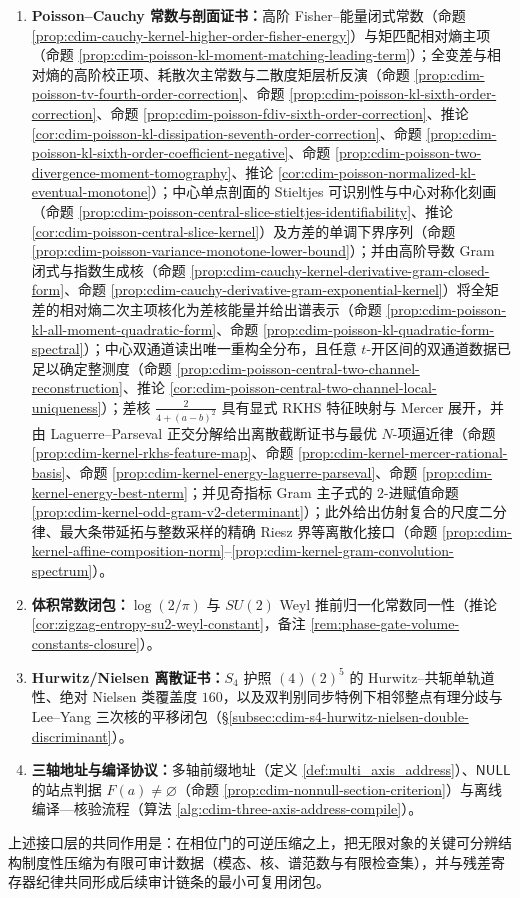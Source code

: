 \begin{enumerate}
  \item \textbf{Poisson--Cauchy 常数与剖面证书：}高阶 Fisher--能量闭式常数（命题 \ref{prop:cdim-cauchy-kernel-higher-order-fisher-energy}）与矩匹配相对熵主项（命题 \ref{prop:cdim-poisson-kl-moment-matching-leading-term}）；全变差与相对熵的高阶校正项、耗散次主常数与二散度矩层析反演（命题 \ref{prop:cdim-poisson-tv-fourth-order-correction}、命题 \ref{prop:cdim-poisson-kl-sixth-order-correction}、命题 \ref{prop:cdim-poisson-fdiv-sixth-order-correction}、推论 \ref{cor:cdim-poisson-kl-dissipation-seventh-order-correction}、命题 \ref{prop:cdim-poisson-kl-sixth-order-coefficient-negative}、命题 \ref{prop:cdim-poisson-two-divergence-moment-tomography}、推论 \ref{cor:cdim-poisson-normalized-kl-eventual-monotone}）；中心单点剖面的 Stieltjes 可识别性与中心对称化刻画（命题 \ref{prop:cdim-poisson-central-slice-stieltjes-identifiability}、推论 \ref{cor:cdim-poisson-central-slice-kernel}）及方差的单调下界序列（命题 \ref{prop:cdim-poisson-variance-monotone-lower-bound}）；并由高阶导数 Gram 闭式与指数生成核（命题 \ref{prop:cdim-cauchy-kernel-derivative-gram-closed-form}、命题 \ref{prop:cdim-cauchy-derivative-gram-exponential-kernel}）将全矩差的相对熵二次主项核化为差核能量并给出谱表示（命题 \ref{prop:cdim-poisson-kl-all-moment-quadratic-form}、命题 \ref{prop:cdim-poisson-kl-quadratic-form-spectral}）；中心双通道读出唯一重构全分布，且任意 \texorpdfstring{$t$}{t}-开区间的双通道数据已足以确定整测度（命题 \ref{prop:cdim-poisson-central-two-channel-reconstruction}、推论 \ref{cor:cdim-poisson-central-two-channel-local-uniqueness}）；差核 \(\frac{2}{4+(a-b)^2}\) 具有显式 RKHS 特征映射与 Mercer 展开，并由 Laguerre--Parseval 正交分解给出离散截断证书与最优 \(N\)-项逼近律（命题 \ref{prop:cdim-kernel-rkhs-feature-map}、命题 \ref{prop:cdim-kernel-mercer-rational-basis}、命题 \ref{prop:cdim-kernel-energy-laguerre-parseval}、命题 \ref{prop:cdim-kernel-energy-best-nterm}；并见奇指标 Gram 主子式的 \(2\)-进赋值命题 \ref{prop:cdim-kernel-odd-gram-v2-determinant}）；此外给出仿射复合的尺度二分律、最大条带延拓与整数采样的精确 Riesz 界等离散化接口（命题 \ref{prop:cdim-kernel-affine-composition-norm}--\ref{prop:cdim-kernel-gram-convolution-spectrum}）。
  \item \textbf{体积常数闭包：}\(\log(2/\pi)\) 与 \(SU(2)\) Weyl 推前归一化常数同一性（推论 \ref{cor:zigzag-entropy-su2-weyl-constant}，备注 \ref{rem:phase-gate-volume-constants-closure}）。
  \item \textbf{Hurwitz/Nielsen 离散证书：}\(S_4\) 护照 \((4)(2)^5\) 的 Hurwitz--共轭单轨道性、绝对 Nielsen 类覆盖度 \(160\)，以及双判别同步特例下相邻整点有理分歧与 Lee--Yang 三次核的平移闭包（\S\ref{subsec:cdim-s4-hurwitz-nielsen-double-discriminant}）。
  \item \textbf{三轴地址与编译协议：}多轴前缀地址（定义 \ref{def:multi_axis_address}）、\(\mathsf{NULL}\) 的站点判据 \(F(a)\neq\varnothing\)（命题 \ref{prop:cdim-nonnull-section-criterion}）与离线编译—核验流程（算法 \ref{alg:cdim-three-axis-address-compile}）。
\end{enumerate}
上述接口层的共同作用是：在相位门的可逆压缩之上，把无限对象的关键可分辨结构制度性压缩为有限可审计数据（模态、核、谱范数与有限检查集），并与残差寄存器纪律共同形成后续审计链条的最小可复用闭包。

\endinput

